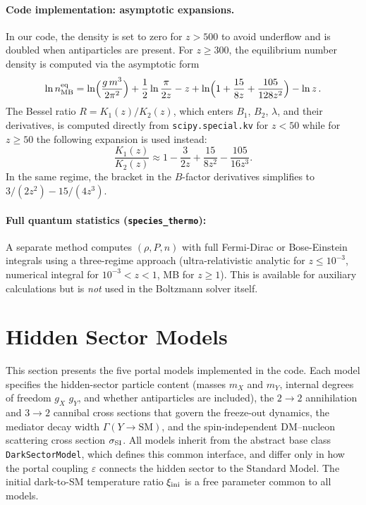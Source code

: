 \documentclass[11pt]{article}
\numberwithin{equation}{section}
\newcommand{\mX}{m_X}
\newcommand{\mY}{m_Y}
\newcommand{\epsX}{\varepsilon}
\newcommand{\neqMB}{n^{\text{eq}}_{\rm MB}}
\begin{document}
\paragraph{Code implementation: asymptotic expansions.}
In our code, the density is set to zero for $z > 500$ to avoid underflow and is doubled when antiparticles are present. For $z \geq 300$, the equilibrium number density is computed via the asymptotic form
\begin{equation}
    \ln \neqMB = \ln\!\Big(\frac{g\,m^3}{2\pi^2}\Big) + \frac{1}{2}\ln\frac{\pi}{2z} - z + \ln\!\Big(1 + \frac{15}{8z} + \frac{105}{128z^2}\Big) - \ln z\,.
\end{equation}
The Bessel ratio $R = K_1(z)/K_2(z)$, which enters $B_1$, $B_2$, $\lambda$, and their derivatives, is computed directly from \texttt{scipy.special.kv} for $z < 50$ while for $z \geq 50$ the following expansion is used instead:
\begin{equation}
    \frac{K_1(z)}{K_2(z)} \approx 1 - \frac{3}{2z} + \frac{15}{8z^2} - \frac{105}{16z^3}.
\end{equation}
In the same regime, the bracket in the $B$-factor derivatives simplifies to $3/(2z^2) - 15/(4z^3)$.
 
\paragraph{Full quantum statistics (\texttt{species\_thermo}):} A separate method computes $(\rho, P, n)$ with full Fermi-Dirac or Bose-Einstein integrals using a three-regime approach (ultra-relativistic analytic for $z \leq 10^{-3}$, numerical integral for $10^{-3} < z < 1$, MB for $z \geq 1$). This is available for auxiliary calculations but is \emph{not} used in the Boltzmann solver itself.


\section{Hidden Sector Models}
\label{sec:models}

This section presents the five portal models implemented in the code. Each model specifies the hidden-sector particle content (masses $\mX$ and $\mY$, internal degrees of freedom $g_X$
$g_Y$, and whether antiparticles are included), the $2\to2$  annihilation and $3\to2$ cannibal cross sections that govern the freeze-out dynamics, the mediator decay width $\Gamma(Y\to\mathrm{SM})$, and the spin-independent DM--nucleon scattering cross section $\sigma_{\rm SI}$. All models inherit from the abstract base class \texttt{DarkSectorModel}, which defines this common interface, and differ only in how the portal coupling $\epsX$ connects the hidden sector to the Standard Model. The initial dark-to-SM temperature ratio $\xi_{\rm ini}$ is a free parameter common to all models.
\end{document}
